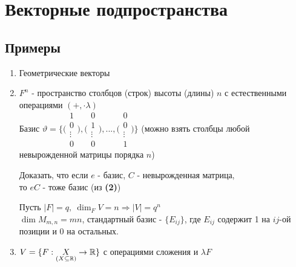 \section{Векторные подпространства}
  \subsection{Примеры}
  \begin{enumerate}
    \item Геометрические векторы
    \item $F^n$ - пространство столбцов (строк) высоты (длины) $n$ с естественными операциями $(+, \cdot \lambda)$ \vspace{0.4cm}\\
    Базис $\vartheta  = \bigg\{ \Biggl( \begin{smallmatrix}
      1 \\ 0 \\ \vdots \\ 0
    \end{smallmatrix}\Biggr), \Biggl(\begin{smallmatrix}
      0 \\ 1 \\ \vdots \\ 0
    \end{smallmatrix}\Biggr), ... , \Biggl(\begin{smallmatrix}
      0 \\ 0 \\ \vdots \\ 1
    \end{smallmatrix}\Biggr) \bigg\}$ (можно взять столбцы любой\vspace{0.3cm}\\ невырожденной матрицы порядка $n$)
    \begin{remark}
      Доказать, что если $e$ - базис, $C$ - невырожденная матрица,\\ то $eC$ - тоже базис (из \textbf{(2)})
    \end{remark} 
    \begin{exercise}
      Пусть $|F| = q, \ \dim_F V = n \Longrightarrow |V| = q^n$\\
      $\dim M_{m,n} = mn$, стандартный базис - $\{E_{ij}\}$, где $E_{ij}$ содержит 1 на $ij$-ой позиции и $0$ на остальных.  
    \end{exercise}
    \item $V = \{F:\underset{(X\subseteq \mathbb R)}{X} \to \mathbb R\}$ с операциями сложения и $\lambda F$\\

\end{enumerate}
